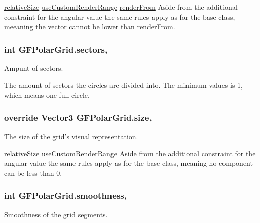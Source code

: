 \hyperlink{class_g_f_grid_a65d207e3957240c935645db01a199419_a65d207e3957240c935645db01a199419}{relative\+Size} \hyperlink{class_g_f_grid_acb950aa31097c85e153cd9a642900a31_acb950aa31097c85e153cd9a642900a31}{use\+Custom\+Render\+Range} \hyperlink{class_g_f_polar_grid_a9f4b9bcd687f29d56f4aafa74655e27b_a9f4b9bcd687f29d56f4aafa74655e27b}{render\+From} Aside from the additional constraint for the angular value the same rules apply as for the base class, meeaning the vector cannot be lower than \hyperlink{class_g_f_polar_grid_a9f4b9bcd687f29d56f4aafa74655e27b_a9f4b9bcd687f29d56f4aafa74655e27b}{render\+From}. \hypertarget{class_g_f_polar_grid_a10ed1b65007dca14afb8fb6d22d36de0_a10ed1b65007dca14afb8fb6d22d36de0}{
\subsubsection[{sectors}]{\setlength{\rightskip}{0pt plus 5cm}int G\+F\+Polar\+Grid.\+sectors\hspace{0.3cm}{\ttfamily [get]}, {\ttfamily [set]}}}\label{class_g_f_polar_grid_a10ed1b65007dca14afb8fb6d22d36de0_a10ed1b65007dca14afb8fb6d22d36de0}
Ampunt of sectors.

The amount of sectors the circles are divided into. The minimum values is 1, which means one full circle. \hypertarget{class_g_f_polar_grid_a851ff16bfbf1204a1ab0b1b4de3ceb35_a851ff16bfbf1204a1ab0b1b4de3ceb35}{
\subsubsection[{size}]{\setlength{\rightskip}{0pt plus 5cm}override Vector3 G\+F\+Polar\+Grid.\+size\hspace{0.3cm}{\ttfamily [get]}, {\ttfamily [set]}}}\label{class_g_f_polar_grid_a851ff16bfbf1204a1ab0b1b4de3ceb35_a851ff16bfbf1204a1ab0b1b4de3ceb35}
The size of the grid's visual representation.

\hyperlink{class_g_f_grid_a65d207e3957240c935645db01a199419_a65d207e3957240c935645db01a199419}{relative\+Size} \hyperlink{class_g_f_grid_acb950aa31097c85e153cd9a642900a31_acb950aa31097c85e153cd9a642900a31}{use\+Custom\+Render\+Range} Aside from the additional constraint for the angular value the same rules apply as for the base class, meaning no component can be less than 0. \hypertarget{class_g_f_polar_grid_a734237fa4e6ad811a84f36d6532ba9f9_a734237fa4e6ad811a84f36d6532ba9f9}{
\subsubsection[{smoothness}]{\setlength{\rightskip}{0pt plus 5cm}int G\+F\+Polar\+Grid.\+smoothness\hspace{0.3cm}{\ttfamily [get]}, {\ttfamily [set]}}}\label{class_g_f_polar_grid_a734237fa4e6ad811a84f36d6532ba9f9_a734237fa4e6ad811a84f36d6532ba9f9}
Smoothness of the grid segments.


